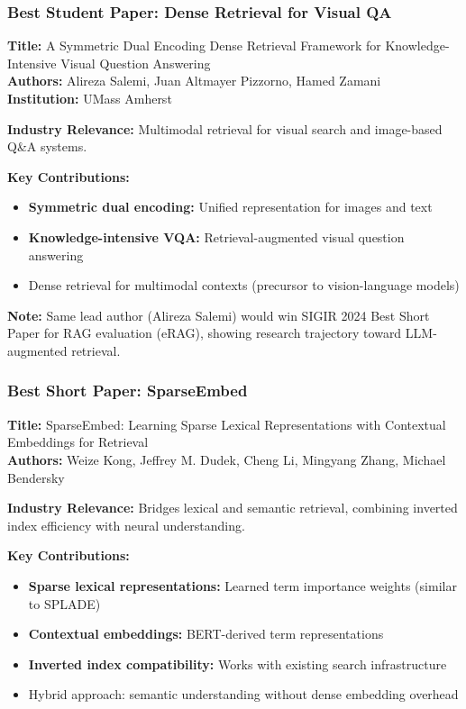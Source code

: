 \documentclass[11pt,letterpaper]{article}
\begin{document}
\subsubsection{Best Student Paper: Dense Retrieval for Visual QA}
\textbf{Title:} A Symmetric Dual Encoding Dense Retrieval Framework for Knowledge-Intensive Visual Question Answering\\
\textbf{Authors:} Alireza Salemi, Juan Altmayer Pizzorno, Hamed Zamani\\
\textbf{Institution:} UMass Amherst

\textbf{Industry Relevance:} Multimodal retrieval for visual search and image-based Q\&A systems.

\textbf{Key Contributions:}
\begin{itemize}[leftmargin=*]
    \item \textbf{Symmetric dual encoding:} Unified representation for images and text
    \item \textbf{Knowledge-intensive VQA:} Retrieval-augmented visual question answering
    \item Dense retrieval for multimodal contexts (precursor to vision-language models)
\end{itemize}

\textbf{Note:} Same lead author (Alireza Salemi) would win SIGIR 2024 Best Short Paper for RAG evaluation (eRAG), showing research trajectory toward LLM-augmented retrieval.

\subsubsection{Best Short Paper: SparseEmbed}
\textbf{Title:} SparseEmbed: Learning Sparse Lexical Representations with Contextual Embeddings for Retrieval\\
\textbf{Authors:} Weize Kong, Jeffrey M. Dudek, Cheng Li, Mingyang Zhang, Michael Bendersky

\textbf{Industry Relevance:} Bridges lexical and semantic retrieval, combining inverted index efficiency with neural understanding.

\textbf{Key Contributions:}
\begin{itemize}[leftmargin=*]
    \item \textbf{Sparse lexical representations:} Learned term importance weights (similar to SPLADE)
    \item \textbf{Contextual embeddings:} BERT-derived term representations
    \item \textbf{Inverted index compatibility:} Works with existing search infrastructure
    \item Hybrid approach: semantic understanding without dense embedding overhead
\end{itemize}
\end{document}
